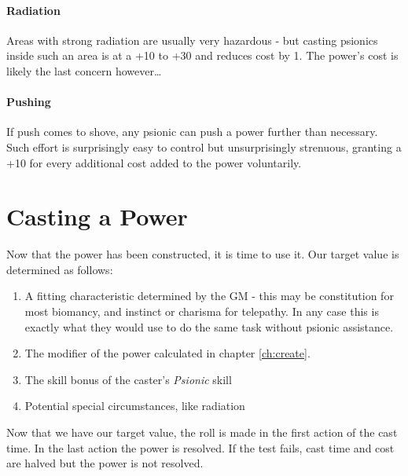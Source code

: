\documentclass[12pt,a4paper,openany]{book}
\begin{document}
	\subsubsection{Radiation}
	Areas with strong radiation are usually very hazardous - but casting psionics inside such an area is at a +10 to +30 and reduces cost by 1. The power’s cost is likely the last concern however…
	\subsubsection{Pushing}
	If push comes to shove, any psionic can push a power further than necessary. Such effort is surprisingly easy to control but unsurprisingly strenuous, granting a +10 for every additional cost added to the power voluntarily.

	\chapter{Casting a Power}
	Now that the power has been constructed, it is time to use it. Our target value is determined as follows:
	\begin{enumerate}
		\item A fitting characteristic determined by the GM - this may be constitution for most biomancy, and instinct or charisma for telepathy. In any case this is exactly what they would use to do the same task without psionic assistance.
		\item The modifier of the power calculated in chapter \ref{ch:create}.
		\item The skill bonus of the caster's \emph{Psionic} skill
		\item Potential special circumstances, like radiation
	\end{enumerate}
	Now that we have our target value, the roll is made in the first action of the cast time. In the last action the power is resolved. If the test fails, cast time and cost are halved but the power is not resolved.
\end{document}

